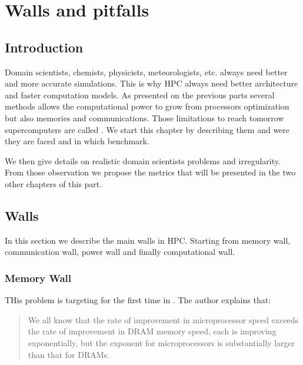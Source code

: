 
\chapter{Walls and pitfalls}

\section{Introduction}
Domain scientists, chemists, physicists, meteorologists, etc. always need better and more accurate simulations. 
This is why HPC always need better architecture and faster computation models. 
As presented on the previous parts several methods allows the computational power to grow from processors optimization but also memories and communications. 
Those limitations to reach tomorrow supercomputers are called .
We start this chapter by describing them and were they are faced and in which benchmark.

We then give details on realistic domain scientists problems and irregularity.
From those observation we propose the metrics that will be presented in the two other chapters of this part. 

\section{Walls}
In this section we describe the main walls in HPC.
Starting from memory wall, communication wall, power wall and finally computational wall.

\subsection{Memory Wall}
THis problem is targeting for the first time in \cite{wulf1995hitting}.
The author explains that:

\begin{quotation} We all know that the rate of improvement in microprocessor speed exceeds the rate of
improvement in DRAM memory speed, each is improving exponentially, but the
exponent for microprocessors is substantially larger than that for DRAMs.
\end{quotation} 

